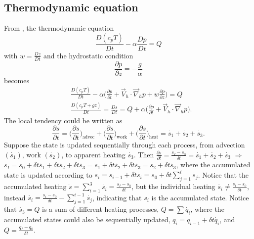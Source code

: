 
\subsection{Thermodynamic equation}
From \cite{boville2003heating}, the thermodynamic equation
\begin{equation}
    \frac{D(c_pT)}{Dt} - \alpha \frac{Dp}{Dt} = Q
\end{equation}
with $w=\frac{Dz}{Dt}$ and the hydrostatic condition
\begin{equation}
    \frac{\partial p}{\partial z} = -\frac{g}{\alpha}
\end{equation}
becomes
\begin{equation}
    \begin{aligned}
        & \frac{D(c_pT)}{Dt} - \alpha \Big( \frac{\partial p}{\partial t} + \vec{V}_h \cdot \vec{\nabla}_h p + w\frac{\partial p}{\partial z}\Big) = Q \\
        & \frac{D(c_pT+gz)}{Dt} = \frac{Ds}{Dt} = Q + \alpha \Big( \frac{\partial p}{\partial t} + \vec{V}_h \cdot \vec{\nabla}_h p \Big).
    \end{aligned}
\end{equation}
The local tendency could be written as  
\begin{equation}
    \frac{\partial s}{\partial t} = \Big(\frac{\partial s}{\partial t}\Big)_{\text{advec}} + 
    \Big(\frac{\partial s}{\partial t}\Big)_{\text{work}} + \Big(\frac{\partial s}{\partial t}\Big)_{\text{heat}}
    = \dot{s_1} + \dot{s_2} + \dot{s_3}.
\end{equation}
Suppose the state is updated sequentially through each process, from advection $(\dot{s_1})$, work $(\dot{s_2})$, to apparent heating $\dot{s_3}$. 
Then $\frac{\partial s}{\partial t} = \frac{s_I - s_0}{\delta t} = \dot{s_1} + \dot{s_2} + \dot{s_3}$ $\Rightarrow$
$s_I = s_0 + \delta t \dot{s_1} + \delta t \dot{s_2} + \delta t \dot{s_3} = s_1 + \delta t \dot{s_2} + \delta t \dot{s_3} = s_2 + \delta t \dot{s_3}$, 
where the accumulated state is updated according to $s_i = s_{i-1} + \delta t \dot{s_i} = s_0 + \delta t \sum_{j=1}^{i} \dot{s_j} $.
Notice that the accumulated heating $\dot{s} = \sum_{i=1}^3 \dot{s_i} = \frac{s_I-s_0}{\delta t}$, but the individual heating
$\dot{s_i} \neq \frac{s_i-s_0}{\delta t}$, instead $\dot{s_i} = \frac{s_i-s_0}{\delta t} - \sum_{j=1}^{i-1} \dot{s_j}$, 
indicating that $s_i$ is the accumulated state.
Notice that $\dot{s_3} = Q$ is a sum of different heating processes, $Q = \sum \dot{q_i}$, 
where the accumulated states could also be sequentially updated, $q_{i} = q_{i-1} + \delta t \dot{q_i}$, and $Q = \frac{q_I-q_0}{\delta t}$. 

